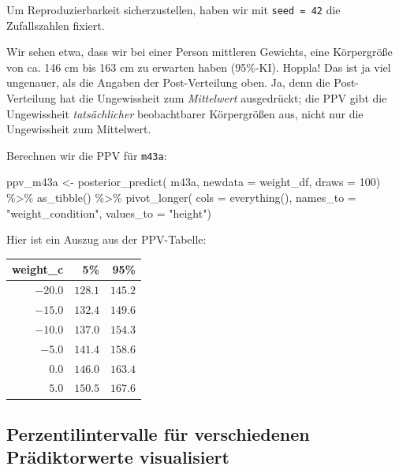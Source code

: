 \documentclass[
  a4paper,
  DIV=11]{scrreprt}
\newenvironment{Shaded}{\begin{snugshade}}{\end{snugshade}}
\newcommand{\AttributeTok}[1]{\textcolor[rgb]{0.40,0.45,0.13}{#1}}
\newcommand{\DecValTok}[1]{\textcolor[rgb]{0.68,0.00,0.00}{#1}}
\newcommand{\FunctionTok}[1]{\textcolor[rgb]{0.28,0.35,0.67}{#1}}
\newcommand{\NormalTok}[1]{\textcolor[rgb]{0.00,0.23,0.31}{#1}}
\newcommand{\OtherTok}[1]{\textcolor[rgb]{0.00,0.23,0.31}{#1}}
\newcommand{\SpecialCharTok}[1]{\textcolor[rgb]{0.37,0.37,0.37}{#1}}
\newcommand{\StringTok}[1]{\textcolor[rgb]{0.13,0.47,0.30}{#1}}
\theoremstyle{definition}
\theoremstyle{remark}
\begin{document}
Um Reproduzierbarkeit sicherzustellen, haben wir mit
\texttt{seed\ =\ 42} die Zufallszahlen fixiert.

Wir sehen etwa, dass wir bei einer Person mittleren Gewichts, eine
Körpergröße von ca. 146 cm bis 163 cm zu erwarten haben (95\%-KI).
Hoppla! Das ist ja viel ungenauer, als die Angaben der Post-Verteilung
oben. Ja, denn die Post-Verteilung hat die Ungewissheit zum
\emph{Mittelwert} ausgedrückt; die PPV gibt die Ungewissheit
\emph{tatsächlicher} beobachtbarer Körpergrößen aus, nicht nur die
Ungewissheit zum Mittelwert.

Berechnen wir die PPV für \texttt{m43a}:

\begin{Shaded}
\begin{Highlighting}[]
\NormalTok{ppv\_m43a }\OtherTok{\textless{}{-}} \FunctionTok{posterior\_predict}\NormalTok{(}
\NormalTok{  m43a,}
  \AttributeTok{newdata =}\NormalTok{ weight\_df,}
  \AttributeTok{draws =} \DecValTok{100}\NormalTok{) }\SpecialCharTok{\%\textgreater{}\%} 
  \FunctionTok{as\_tibble}\NormalTok{() }\SpecialCharTok{\%\textgreater{}\%} 
  \FunctionTok{pivot\_longer}\NormalTok{(}
    \AttributeTok{cols =} \FunctionTok{everything}\NormalTok{(),}
    \AttributeTok{names\_to =} \StringTok{"weight\_condition"}\NormalTok{,}
    \AttributeTok{values\_to =} \StringTok{"height"}\NormalTok{)}
\end{Highlighting}
\end{Shaded}

Hier ist ein Auszug aus der PPV-Tabelle:

\begin{longtable}{rrr}
\toprule
weight\_c & 5\% & 95\% \\ 
\midrule
$-20.0$ & $128.1$ & $145.2$ \\ 
$-15.0$ & $132.4$ & $149.6$ \\ 
$-10.0$ & $137.0$ & $154.3$ \\ 
$-5.0$ & $141.4$ & $158.6$ \\ 
$0.0$ & $146.0$ & $163.4$ \\ 
$5.0$ & $150.5$ & $167.6$ \\ 
\bottomrule
\end{longtable}

\hypertarget{perzentilintervalle-fuxfcr-verschiedenen-pruxe4diktorwerte-visualisiert}{%
\subsection{Perzentilintervalle für verschiedenen Prädiktorwerte
visualisiert}\label{perzentilintervalle-fuxfcr-verschiedenen-pruxe4diktorwerte-visualisiert}}
\end{document}
